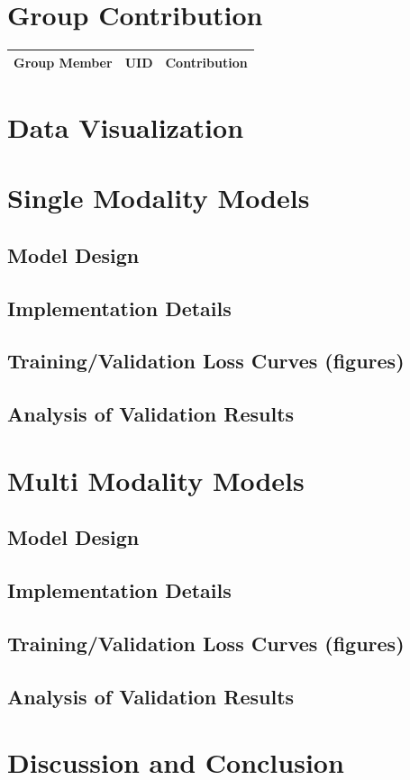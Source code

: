 \section{Group Contribution}
\begin{table}
\begin{tabular}{|c|c|c|}
\hline
\textbf{Group Member} & \textbf{UID} & \textbf{Contribution}\\
\hline
\end{tabular}
\end{table}
\section{Data Visualization}
\section{Single Modality Models}
\subsection{Model Design}
\subsection{Implementation Details}
\subsection{Training/Validation Loss Curves (figures)}
\subsection{Analysis of Validation Results}
\section{Multi Modality Models}
\subsection{Model Design}
\subsection{Implementation Details}
\subsection{Training/Validation Loss Curves (figures)}
\subsection{Analysis of Validation Results}
\section{Discussion and Conclusion}

